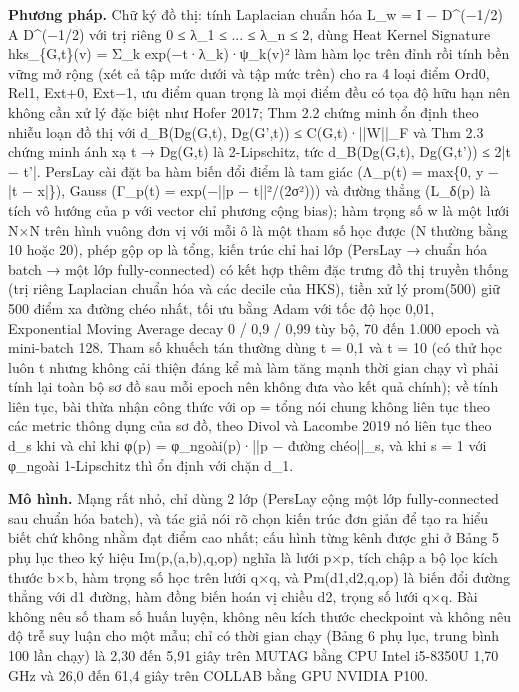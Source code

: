 \documentclass[12pt,a4paper]{article}
\begin{document}
\noindent \textbf{Phương pháp.} Chữ ký đồ thị: tính Laplacian chuẩn hóa L\_w = I − D\textasciicircum{}(−1/2) A D\textasciicircum{}(−1/2) với trị riêng 0 ≤ λ\_1 ≤ ... ≤ λ\_n ≤ 2, dùng Heat Kernel Signature hks\_\{G,t\}(v) = Σ\_k exp(−t·λ\_k)·ψ\_k(v)² làm hàm lọc trên đỉnh rồi tính bền vững mở rộng (xét cả tập mức dưới và tập mức trên) cho ra 4 loại điểm Ord0, Rel1, Ext+0, Ext−1, ưu điểm quan trọng là mọi điểm đều có tọa độ hữu hạn nên không cần xử lý đặc biệt như Hofer 2017; Thm 2.2 chứng minh ổn định theo nhiễu loạn đồ thị với d\_B(Dg(G,t), Dg(G',t)) ≤ C(G,t)·||W||\_F và Thm 2.3 chứng minh ánh xạ t → Dg(G,t) là 2-Lipschitz, tức d\_B(Dg(G,t), Dg(G,t')) ≤ 2|t − t'|. PersLay cài đặt ba hàm biến đổi điểm là tam giác (Λ\_p(t) = max\{0, y − |t − x|\}), Gauss (Γ\_p(t) = exp(−||p − t||²/(2σ²))) và đường thẳng (L\_δ(p) là tích vô hướng của p với vector chỉ phương cộng bias); hàm trọng số w là một lưới N×N trên hình vuông đơn vị với mỗi ô là một tham số học được (N thường bằng 10 hoặc 20), phép gộp op là tổng, kiến trúc chỉ hai lớp (PersLay → chuẩn hóa batch → một lớp fully-connected) có kết hợp thêm đặc trưng đồ thị truyền thống (trị riêng Laplacian chuẩn hóa và các decile của HKS), tiền xử lý prom(500) giữ 500 điểm xa đường chéo nhất, tối ưu bằng Adam với tốc độ học 0,01, Exponential Moving Average decay 0 / 0,9 / 0,99 tùy bộ, 70 đến 1.000 epoch và mini-batch 128. Tham số khuếch tán thường dùng t = 0,1 và t = 10 (có thử học luôn t nhưng không cải thiện đáng kể mà làm tăng mạnh thời gian chạy vì phải tính lại toàn bộ sơ đồ sau mỗi epoch nên không đưa vào kết quả chính); về tính liên tục, bài thừa nhận công thức với op = tổng nói chung không liên tục theo các metric thông dụng của sơ đồ, theo Divol và Lacombe 2019 nó liên tục theo d\_s khi và chỉ khi φ(p) = φ\_ngoài(p)·||p − đường chéo||\_s, và khi s = 1 với φ\_ngoài 1-Lipschitz thì ổn định với chặn d\_1.\par\vspace{3pt}
\noindent \textbf{Mô hình.} Mạng rất nhỏ, chỉ dùng 2 lớp (PersLay cộng một lớp fully-connected sau chuẩn hóa batch), và tác giả nói rõ chọn kiến trúc đơn giản để tạo ra hiểu biết chứ không nhằm đạt điểm cao nhất; cấu hình từng kênh được ghi ở Bảng 5 phụ lục theo ký hiệu Im(p,(a,b),q,op) nghĩa là lưới p×p, tích chập a bộ lọc kích thước b×b, hàm trọng số học trên lưới q×q, và Pm(d1,d2,q,op) là biến đổi đường thẳng với d1 đường, hàm đồng biến hoán vị chiều d2, trọng số lưới q×q. Bài không nêu số tham số huấn luyện, không nêu kích thước checkpoint và không nêu độ trễ suy luận cho một mẫu; chỉ có thời gian chạy (Bảng 6 phụ lục, trung bình 100 lần chạy) là 2,30 đến 5,91 giây trên MUTAG bằng CPU Intel i5-8350U 1,70 GHz và 26,0 đến 61,4 giây trên COLLAB bằng GPU NVIDIA P100.\par\vspace{3pt}
\end{document}
